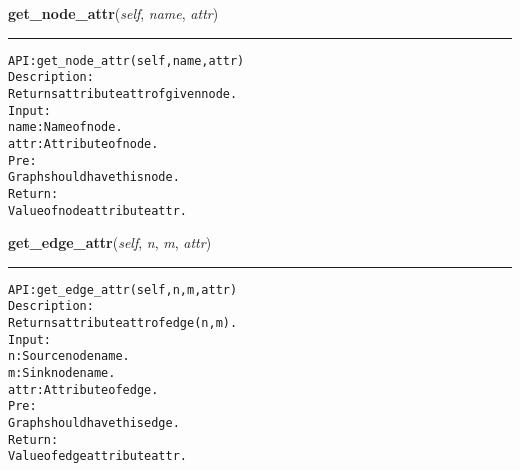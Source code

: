 \hspace{.8\funcindent}\begin{boxedminipage}{\funcwidth}

    \raggedright \textbf{get\_node\_attr}(\textit{self}, \textit{name}, \textit{attr})

    \vspace{-1.5ex}

    \rule{\textwidth}{0.5\fboxrule}
\setlength{\parskip}{2ex}
\begin{alltt}

API: get\_node\_attr(self, name, attr)
Description:
Returns attribute attr of given node.
Input:
    name: Name of node.
    attr: Attribute of node.
Pre:
    Graph should have this node.
Return:
    Value of node attribute attr.
\end{alltt}

\setlength{\parskip}{1ex}
    \end{boxedminipage}

    \label{coinor:gimpy:graph:Graph:get_edge_attr}

    \vspace{0.5ex}

\hspace{.8\funcindent}\begin{boxedminipage}{\funcwidth}

    \raggedright \textbf{get\_edge\_attr}(\textit{self}, \textit{n}, \textit{m}, \textit{attr})

    \vspace{-1.5ex}

    \rule{\textwidth}{0.5\fboxrule}
\setlength{\parskip}{2ex}
\begin{alltt}

API: get\_edge\_attr(self, n, m, attr)
Description:
Returns attribute attr of edge (n,m).
Input:
    n: Source node name.
    m: Sink node name.
    attr: Attribute of edge.
Pre:
    Graph should have this edge.
Return:
    Value of edge attribute attr.
\end{alltt}

\setlength{\parskip}{1ex}
    \end{boxedminipage}

    \label{coinor:gimpy:graph:Graph:set_node_attr}

